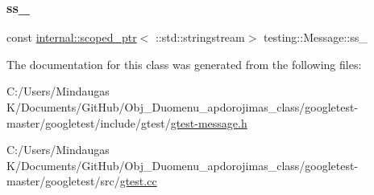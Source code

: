 \mbox{\label{classtesting_1_1_message_ad46fbddd62cde8526744ae32e3322b76}} 
\subsubsection{\texorpdfstring{ss\_}{ss\_}\hspace{0.1cm}{\footnotesize\ttfamily [2/2]}}
{\footnotesize\ttfamily const \mbox{\hyperlink{classtesting_1_1internal_1_1scoped__ptr}{internal\+::scoped\+\_\+ptr}}$<$ \+::std\+::stringstream$>$ testing\+::\+Message\+::ss\+\_\+\hspace{0.3cm}{\ttfamily [private]}}



The documentation for this class was generated from the following files\+:\begin{DoxyCompactItemize}
\item 
C\+:/\+Users/\+Mindaugas K/\+Documents/\+Git\+Hub/\+Obj\+\_\+\+Duomenu\+\_\+apdorojimas\+\_\+class/googletest-\/master/googletest/include/gtest/\mbox{\hyperlink{googletest-master_2googletest_2include_2gtest_2gtest-message_8h}{gtest-\/message.\+h}}\item 
C\+:/\+Users/\+Mindaugas K/\+Documents/\+Git\+Hub/\+Obj\+\_\+\+Duomenu\+\_\+apdorojimas\+\_\+class/googletest-\/master/googletest/src/\mbox{\hyperlink{googletest-master_2googletest_2src_2gtest_8cc}{gtest.\+cc}}\end{DoxyCompactItemize}

